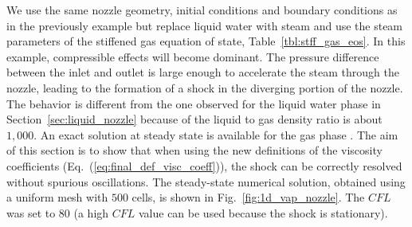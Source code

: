 \documentclass[review,10pt]{elsarticle}
\newcommand{\eqt}[1]{Eq.~(\ref{#1})}                     %
\newcommand{\fig}[1]{Fig.~\ref{#1}}                      %
\newcommand{\tbl}[1]{Table~\ref{#1}}                     %
\newcommand{\sct}[1]{Section~\ref{#1}}                   %
\begin{document}
We use the same nozzle geometry, initial conditions and boundary conditions as in the previously example but replace liquid water 
with steam and use the steam parameters of the stiffened gas equation of state, \tbl{tbl:stff_gas_eos}. In this example, 
compressible effects will become dominant. 
The pressure difference between the inlet and outlet is large enough to accelerate the steam through the nozzle, leading 
to the formation of a shock in the diverging portion of the nozzle. The behavior is different from the one observed for the 
liquid water phase in \sct{sec:liquid_nozzle} because of the liquid to gas density ratio is about $1,000$. An exact 
solution at steady state is available for the gas phase \cite{nozzle_exact}. The aim of this section is to show that 
when using the new definitions of the viscosity coefficients (\eqt{eq:final_def_visc_coeff}), the shock can be 
correctly resolved without spurious oscillations. The steady-state numerical solution, obtained using a uniform 
mesh with $500$ cells, is shown in \fig{fig:1d_vap_nozzle}. The $CFL$ was set to $80$ (a high $CFL$ value can be used because the shock is stationary).
\end{document}
